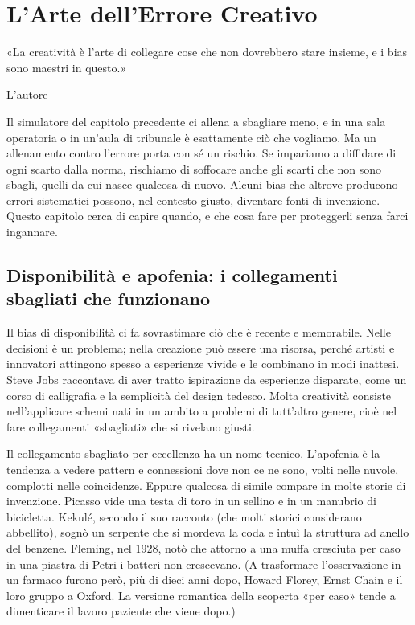\chapter{L'Arte dell'Errore Creativo}
\label{cap:p4c17}

\epigraph{«La creatività è l'arte di collegare cose che non dovrebbero stare insieme, e i bias sono maestri in questo.»}{L'autore}

Il simulatore del capitolo precedente ci allena a sbagliare meno, e in una sala operatoria o in un'aula di tribunale è esattamente ciò che vogliamo. Ma un allenamento contro l'errore porta con sé un rischio. Se impariamo a diffidare di ogni scarto dalla norma, rischiamo di soffocare anche gli scarti che non sono sbagli, quelli da cui nasce qualcosa di nuovo. Alcuni bias che altrove producono errori sistematici possono, nel contesto giusto, diventare fonti di invenzione. Questo capitolo cerca di capire quando, e che cosa fare per proteggerli senza farci ingannare.

\section{Disponibilità e apofenia: i collegamenti sbagliati che funzionano}

Il bias di disponibilità ci fa sovrastimare ciò che è recente e memorabile. Nelle decisioni è un problema; nella creazione può essere una risorsa, perché artisti e innovatori attingono spesso a esperienze vivide e le combinano in modi inattesi. Steve Jobs raccontava di aver tratto ispirazione da esperienze disparate, come un corso di calligrafia e la semplicità del design tedesco. Molta creatività consiste nell'applicare schemi nati in un ambito a problemi di tutt'altro genere, cioè nel fare collegamenti «sbagliati» che si rivelano giusti.

Il collegamento sbagliato per eccellenza ha un nome tecnico. L'apofenia è la tendenza a vedere pattern e connessioni dove non ce ne sono, volti nelle nuvole, complotti nelle coincidenze. Eppure qualcosa di simile compare in molte storie di invenzione. Picasso vide una testa di toro in un sellino e in un manubrio di bicicletta. Kekulé, secondo il suo racconto (che molti storici considerano abbellito), sognò un serpente che si mordeva la coda e intuì la struttura ad anello del benzene. Fleming, nel 1928, notò che attorno a una muffa cresciuta per caso in una piastra di Petri i batteri non crescevano. (A trasformare l'osservazione in un farmaco furono però, più di dieci anni dopo, Howard Florey, Ernst Chain e il loro gruppo a Oxford. La versione romantica della scoperta «per caso» tende a dimenticare il lavoro paziente che viene dopo.)

